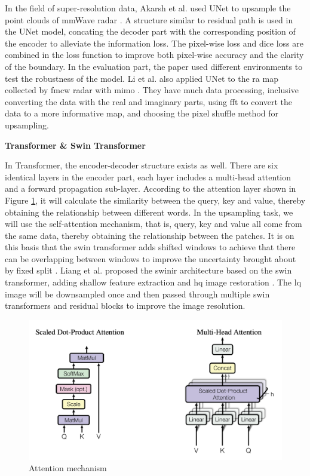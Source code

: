 In the field of super-resolution data, Akarsh et al. used UNet to upsample the point clouds of mmWave radar \cite{prabhakara_high_2023}. A structure similar to residual path is used in the UNet model, concating the decoder part with the corresponding position of the encoder to alleviate the information loss. The pixel-wise loss and dice loss are combined in the loss function to improve both pixel-wise accuracy and the clarity of the boundary. In the evaluation part, the paper used different environments to test the robustness of the model. Li et al. also applied UNet to the \gls{ra} map collected by \gls{fmcw} radar with \gls{mimo} \cite{li_azimuth_2023}. They have much data processing, inclusive converting the data with the real and imaginary parts, using \gls{fft} to convert the data to a more informative map, and choosing the pixel shuffle method for upsampling.

\begin{spacing}{1.5}
\textbf{\large {Transformer \& Swin Transformer}}
\end{spacing}

In Transformer, the encoder-decoder structure exists as well. There are six identical layers in the encoder part, each layer includes a multi-head attention and a forward propagation sub-layer. According to the attention layer shown in Figure \ref{attention mechanism}, it will calculate the similarity between the query, key and value, thereby obtaining the relationship between different words. In the upsampling task, we will use the self-attention mechanism, that is, query, key and value all come from the same data, thereby obtaining the relationship between the patches. It is on this basis that the \gls{swin} transformer adds shifted windows to achieve that there can be overlapping between windows to improve the uncertainty brought about by fixed split \cite{liu_swin_2021}. Liang et al. proposed the \gls{swinir} architecture based on the \gls{swin} transformer, adding shallow feature extraction and \gls{hq} image restoration \cite{liang_swinir_2021}. The \gls{lq} image will be downsampled once and then passed through multiple \gls{swin} transformers and residual blocks to improve the image resolution.

\begin{figure}
	\centering
	\includegraphics[scale=.65]{figures/attention.png}
	\caption{Attention mechanism \cite{vaswani_attention_2023}}
	\label{attention mechanism}
\end{figure}

